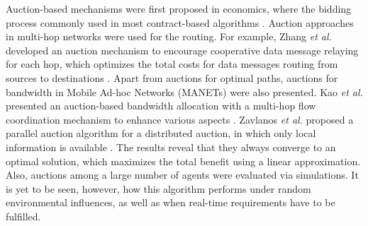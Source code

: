 \documentclass[journal]{IEEEtran}  %
\begin{document}
Auction-based mechanisms were first proposed in economics, where the bidding
process commonly used in most contract-based algorithms 
\cite{duan2014contractAuction}.
Auction approaches in multi-hop networks were used for the routing. %
For example, Zhang \textit{et al.} developed an auction mechanism to encourage
cooperative data message relaying for each hop, which optimizes the total costs
for data messages routing from sources to destinations \cite{zhang2010aim}. 
Apart from auctions for optimal paths, auctions for bandwidth in Mobile
Ad-hoc Networks (MANETs) were also presented. 
Kao \textit{et al.} presented an auction-based bandwidth allocation with
a multi-hop flow coordination mechanism to enhance various aspects
\cite{bw2011allocation}.
Zavlanos \textit{et al.} proposed a parallel auction algorithm for a
distributed auction, in which only local information is available
\cite{ZavlDistAuc2008}. 
The results reveal that they always converge to an optimal solution, which
maximizes the total benefit using a linear approximation. 
Also, auctions among a large number of agents were evaluated via
simulations. 
It is yet to be seen, however, how this algorithm performs under random
environmental influences, as well as when real-time requirements have to be
fulfilled.
\end{document}
